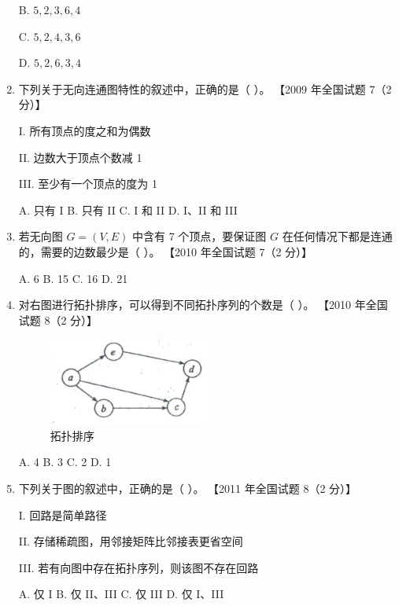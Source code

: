 \documentclass[lang=cn,newtx,10pt,scheme=chinese]{elegantbook}
\begin{document}
\begin{enumerate}
        B. $5, 2, 3, 6, 4$  

        C. $5, 2, 4, 3, 6$  

        D. $5, 2, 6, 3, 4$  


        \item 下列关于无向连通图特性的叙述中，正确的是（ ）。  
        【2009 年全国试题 7（2 分）】 

        I. 所有顶点的度之和为偶数  

        II. 边数大于顶点个数减 1  

        III. 至少有一个顶点的度为 1  

        A. 只有 I \quad B. 只有 II \quad C. I 和 II \quad D. I、II 和 III  
    
        \item 若无向图 $G = (V, E)$ 中含有 7 个顶点，要保证图 $G$ 在任何情况下都是连通的，需要的边数最少是（ ）。  
        【2010 年全国试题 7（2 分）】  

        A. 6 \quad B. 15 \quad C. 16 \quad D. 21  
    
        \item 对右图进行拓扑排序，可以得到不同拓扑序列的个数是（ ）。  
        【2010 年全国试题 8（2 分）】  

        \begin{figure}[h!]
            \centering
            \includegraphics[width=0.5\textwidth]{./figure/exercisePicPDF/chapter7/7-10.pdf}
            \caption{拓扑排序}
        \end{figure}

        A. 4 \quad B. 3 \quad C. 2 \quad D. 1  
    
        \item 下列关于图的叙述中，正确的是（ ）。  
        【2011 年全国试题 8（2 分）】  

        I. 回路是简单路径  

        II. 存储稀疏图，用邻接矩阵比邻接表更省空间  

        III. 若有向图中存在拓扑序列，则该图不存在回路  

        A. 仅 I \quad B. 仅 II、III \quad C. 仅 III \quad D. 仅 I、III  
    

\end{enumerate}
\end{document}
